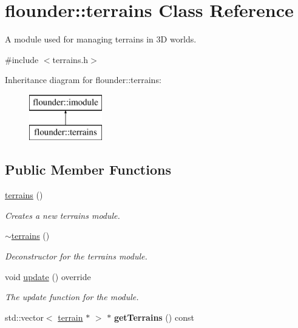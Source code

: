 \hypertarget{classflounder_1_1terrains}{}\section{flounder\+:\+:terrains Class Reference}
\label{classflounder_1_1terrains}


A module used for managing terrains in 3D worlds.  




{\ttfamily \#include $<$terrains.\+h$>$}

Inheritance diagram for flounder\+:\+:terrains\+:\begin{figure}[H]
\begin{center}
\leavevmode
\includegraphics[height=2.000000cm]{classflounder_1_1terrains}
\end{center}
\end{figure}
\subsection*{Public Member Functions}
\begin{DoxyCompactItemize}
\item 
\hyperlink{classflounder_1_1terrains_a9c58f36cb43aa3e10e8135e0ea6a0f6a}{terrains} ()
\begin{DoxyCompactList}\small\item\em Creates a new terrains module. \end{DoxyCompactList}\item 
\hyperlink{classflounder_1_1terrains_a8d4a252a28eead4a542c35731269c927}{$\sim$terrains} ()
\begin{DoxyCompactList}\small\item\em Deconstructor for the terrains module. \end{DoxyCompactList}\item 
void \hyperlink{classflounder_1_1terrains_a4653233110b20bb5249a0913665928df}{update} () override
\begin{DoxyCompactList}\small\item\em The update function for the module. \end{DoxyCompactList}\item 
\mbox{\label{classflounder_1_1terrains_ad222f5c0f913b7042d18a4bfa5482a83}} 
std\+::vector$<$ \hyperlink{classflounder_1_1terrain}{terrain} $\ast$ $>$ $\ast$ {\bfseries get\+Terrains} () const
\end{DoxyCompactItemize}
